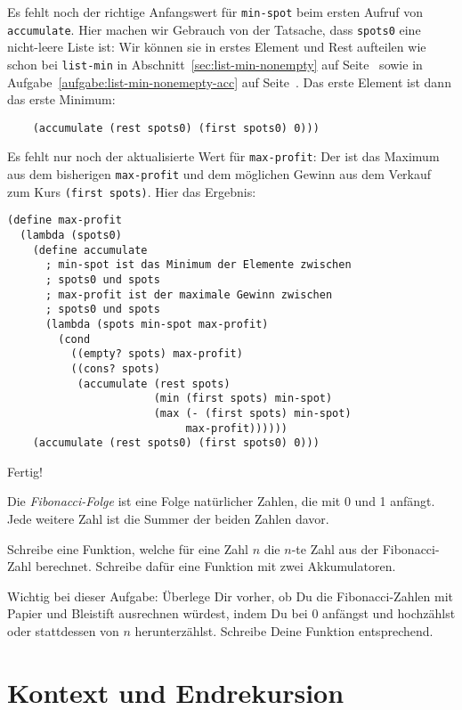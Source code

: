 %
Es fehlt noch der richtige Anfangswert für \lstinline{min-spot} beim
ersten Aufruf von \lstinline{accumulate}.  Hier machen wir Gebrauch
von der Tatsache, dass \lstinline{spots0} eine nicht-leere Liste ist:
Wir können sie in erstes Element und Rest aufteilen wie schon bei
\lstinline{list-min} in Abschnitt~\ref{sec:list-min-nonempty} auf
Seite~\pageref{sec:list-min-nonempty} sowie in
Aufgabe~\ref{aufgabe:list-min-nonemepty-acc} auf
Seite~\pageref{aufgabe:list-min-nonemepty-acc}.  Das erste Element ist
dann das erste Minimum:
%
\begin{lstlisting}
    (accumulate (rest spots0) (first spots0) 0)))
\end{lstlisting}
%
Es fehlt nur noch der aktualisierte Wert für \lstinline{max-profit}:
Der ist das Maximum aus dem bisherigen \lstinline{max-profit} und dem
möglichen Gewinn aus dem Verkauf zum Kurs \lstinline{(first spots)}.
Hier das Ergebnis:
%
\begin{lstlisting}
(define max-profit
  (lambda (spots0)
    (define accumulate
      ; min-spot ist das Minimum der Elemente zwischen
      ; spots0 und spots
      ; max-profit ist der maximale Gewinn zwischen
      ; spots0 und spots
      (lambda (spots min-spot max-profit)
        (cond
          ((empty? spots) max-profit)
          ((cons? spots)
           (accumulate (rest spots)
                       (min (first spots) min-spot)
                       (max (- (first spots) min-spot)
                            max-profit))))))
    (accumulate (rest spots0) (first spots0) 0)))
\end{lstlisting}
%
Fertig!

\begin{aufgabeinline}
  Die \textit{Fibonacci-Folge} ist eine Folge natürlicher Zahlen, die
  mit 0 und 1 anfängt.  Jede weitere Zahl ist die Summer der beiden
  Zahlen davor.

  Schreibe eine Funktion, welche für eine Zahl $n$ die $n$-te Zahl aus
  der Fibonacci-Zahl berechnet.  Schreibe dafür eine Funktion
  mit zwei Akkumulatoren.

  Wichtig bei dieser Aufgabe: Überlege Dir vorher, ob Du die
  Fibonacci-Zahlen mit Papier und Bleistift ausrechnen würdest, indem
  Du bei 0 anfängst und hochzählst oder stattdessen von $n$
  herunterzählst.  Schreibe Deine Funktion entsprechend.
\end{aufgabeinline}

\section{Kontext und Endrekursion}
\label{sec:iteration}
\label{sec:kontext}

